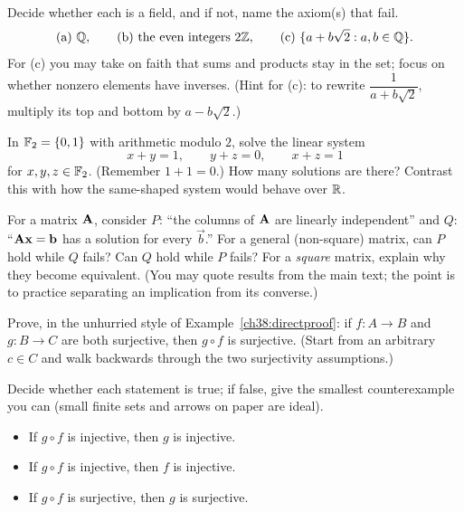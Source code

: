 \begin{exercise}[Is it a field?]
Decide whether each is a field, and if not, name the axiom(s) that fail.
\[
  \text{(a) } \mathbb{Q}, \qquad
  \text{(b) the even integers } 2\mathbb{Z}, \qquad
  \text{(c) } \{a + b\sqrt 2 : a,b \in \mathbb{Q}\}.
\]
For (c) you may take on faith that sums and products stay in the set; focus on whether
nonzero elements have inverses. (Hint for (c): to rewrite $\dfrac{1}{a + b\sqrt 2}$,
multiply its top and bottom by $a - b\sqrt 2$.)
\end{exercise}

\begin{exercise}
In $\mathbb{F}_2 = \{0,1\}$ with arithmetic modulo $2$, solve the linear system
\[
  x + y = 1, \qquad y + z = 0, \qquad x + z = 1
\]
for $x,y,z \in \mathbb{F}_2$. (Remember $1+1 = 0$.) How many solutions are there? Contrast this
with how the same-shaped system would behave over $\mathbb{R}$.
\end{exercise}

\begin{exercise}
For a matrix $\mathbf{A}$, consider $P$: ``the columns of $\mathbf{A}$ are linearly independent''
and $Q$: ``$\mathbf{A}\mathbf{x} = \mathbf{b}$ has a solution for every $\vec{b}$.'' For a general
(non-square) matrix, can $P$ hold while $Q$ fails? Can $Q$ hold while $P$ fails? For a
\emph{square} matrix, explain why they become equivalent. (You may quote results from the
main text; the point is to practice separating an implication from its converse.)
\end{exercise}

\begin{exercise}
Prove, in the unhurried style of Example~\ref{ch38:directproof}: if $f:A\to B$ and
$g:B\to C$ are both surjective, then $g\circ f$ is surjective. (Start from an arbitrary
$c \in C$ and walk backwards through the two surjectivity assumptions.)
\end{exercise}

\begin{exercise}
Decide whether each statement is true; if false, give the smallest counterexample you can
(small finite sets and arrows on paper are ideal).
\begin{itemize}
  \item[(a)] If $g\circ f$ is injective, then $g$ is injective.
  \item[(b)] If $g\circ f$ is injective, then $f$ is injective.
  \item[(c)] If $g\circ f$ is surjective, then $g$ is surjective.
\end{itemize}
\end{exercise}

